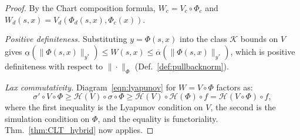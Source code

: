 \documentclass[letterpaper, 10 pt, conference]{IEEEconf}
\theoremstyle{definition}
\newcommand{\K}{\mathcal K}
\newcommand{\functor}[1]{\mathcal{#1}}
\renewcommand{\H}{\functor{H}}
\begin{document}


\begin{proof}
    By the Chart composition formula, $W_c = V_c \circ \Phi_c$ and $W_d(s,x) = V_d(\Phi_d(s,x), \Phi_c(x))$.

    \textit{Positive definiteness.} Substituting $y = \Phi(s,x)$ into the class $\K$ bounds on $V$ gives $\underline{\alpha}(\|\Phi(s,x)\|_{y^*}) \leq W(s,x) \leq \overline{\alpha}(\|\Phi(s,x)\|_{y^*})$, which is positive definiteness with respect to $\|\cdot\|_\Phi$ (Def.~\ref{def:pullbacknorm}).

    \textit{Lax commutativity.} Diagram~\eqref{eqn:lyapunov} for $W = V \circ \Phi$ factors as:
    \[
        \sigma' \circ V \circ \Phi \geq \H(V) \circ \sigma \circ \Phi \geq \H(V) \circ \H(\Phi) \circ f = \H(V \circ \Phi) \circ f,
    \]
    where the first inequality is the Lyapunov condition on $V$, the second is the simulation condition on $\Phi$, and the equality is functoriality. Thm.~\ref{thm:CLT_hybrid} now applies.
\end{proof}
\end{document}
